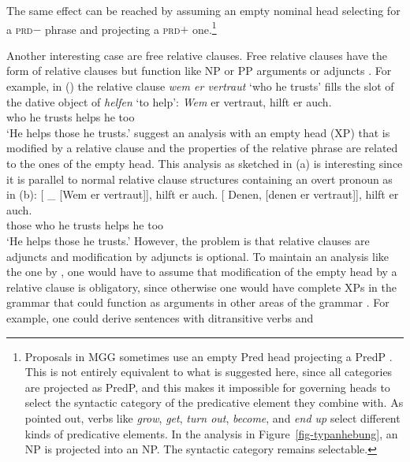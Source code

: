 \documentclass[output=paper
  ,nobabel
  ,draftmode
  ,uniformtopskip %
  ,colorlinks, citecolor=brown
]{langscibook}
\begin{document}
The same effect can be reached by assuming an empty nominal head selecting for a \textsc{prd}$-$
phrase and projecting a \textsc{prd}$+$ one.\footnote{%
Proposals in MGG sometimes use an empty Pred head
projecting a PredP \citep{Bowers93a-u}. This is not entirely equivalent to what is suggested here,
since all categories are projected as PredP, and this makes it impossible for governing heads to
select the syntactic category of the predicative element they combine with. As \citet[--106]{ps2} pointed out, verbs like \emph{grow}, \emph{get}, \emph{turn out}, \emph{become},
and \emph{end up} select different kinds of predicative elements. In the analysis in
Figure~\ref{fig-typanhebung}, an NP is projected into an NP. The syntactic category remains selectable.}

\largerpage
Another interesting case are free relative clauses. Free relative clauses have the form of relative
clauses but function like NP or PP arguments or adjuncts \citep{Bausewein90,Mueller99b}. For
example, in () the relative clause \emph{wem er vertraut} `who he trusts' fills the slot of the dative object of \emph{helfen} `to help':
\ea
\gll \emph{Wem}  er vertraut, hilft er auch.\footnotemark\\
     who he trusts    helps he too\\
\glt `He helps those he trusts.'
\z
%
\citet[Section~2]{GR81a} suggest an analysis with an empty head (XP) that is modified by a relative
clause and the properties of the relative phrase are related to the ones of the empty head. This
analysis as sketched in (a) is interesting since it is parallel to normal relative clause structures containing an
overt pronoun as in (b):
\eal
\ex {}[\sub{\npdat} \_\sub{\npdat} [Wem er vertraut]], hilft er auch.
\ex 
\gll {}[\sub{\npdat} Denen, [denen er vertraut]], hilft er auch.\\
     {}              those              \spacebr{}who   he trusts    helps he too\\
\glt `He helps those he trusts.'
\zl
However, the problem is that relative clauses are adjuncts and modification by adjuncts is
optional. To maintain an analysis like the one by \citeauthor{GR81a}, one would have to assume that
modification of the empty head by a relative clause is obligatory, since otherwise one would have
complete XPs in the grammar that could function as arguments in other areas of the grammar
\citep[]{Mueller99b}. For example, one could derive sentences with ditransitive verbs and
\end{document}
